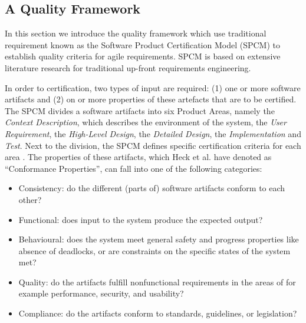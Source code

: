 \subsection{A Quality Framework} \label{usq_2}
In this section we introduce the quality framework which use traditional requirement known as the Software Product Certification Model (SPCM)\cite{heck2010software} to establish quality criteria for agile requirements. SPCM is based on extensive literature research for traditional up-front requirements engineering. 

In order to certification, two types of input are required: (1) one or more software artifacts and (2) on or more properties of these artefacts that are to be certified. The SPCM divides a software artifacts into six Product Areas, namely the \emph{Context Description}, which describes the environment of the system, the \emph{User Requirement}, the \emph{High-Level Design}, the \emph{Detailed Design}, the \emph{Implementation} and \emph{Test}. Next to the division, the SPCM defines specific certification criteria for each area \cite{heck2010software}. The properties of these artifacts, which Heck et al. have denoted as \enquote{Conformance Properties}, can fall into one of the following categories:

\begin{itemize}
\item Consistency: do the different (parts of) software artifacts conform to each other?
\item Functional: does input to the system produce the expected output?
\item Behavioural: does the system meet general safety and progress properties like absence of deadlocks, or are constraints on the specific states of the system met?
\item Quality: do the artifacts fulfill nonfunctional requirements in the areas of for example performance, security, and usability?
\item	Compliance: do the artifacts conform to standards, guidelines, or legislation?

\end{itemize}

